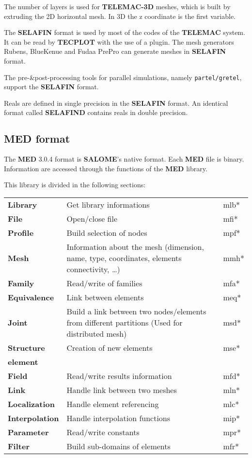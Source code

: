 \documentclass[a4paper,10pt]{article}
\newcommand{\tel}{\textbf{TELEMAC}\xspace}
\newcommand{\teldd}{\textbf{TELEMAC-3D}\xspace}
\newcommand{\slf}{\textbf{SELAFIN}\xspace}
\newcommand{\sal}{\textbf{SALOME}\xspace}
\newcommand{\med}{\textbf{MED}\xspace}
\newcommand{\tecplot}{\textbf{TECPLOT}\xspace}
\begin{document}
The number of layers is used for \teldd meshes, which is built by extruding the 2D horizontal mesh.
In 3D the z coordinate is the first variable.

The \slf format is used by most of the codes of the \tel system. It can be read by \tecplot with the use of a plugin.
The mesh generators Rubens, BlueKenue and Fudaa PrePro can generate meshes in \slf format.

The pre-\&post-processing tools for parallel simulations, namely \verb+partel/gretel+, support the \slf format.

Reals are defined in single precision in the \slf format. An identical format called \textbf{SELAFIND} contains reals in double precision.

\subsection{\med format\cite{med}}

The \med3.0.4 format is \sal's native format. Each \med file is binary. Information are accessed through the functions of the \med library.

This library is divided in the following sections:

\begin{tabular}{p{70pt}@{ : }p{200pt}p{50pt}}
  \textbf{Library} & Get library informations & mlb* \\
  \textbf{File} & Open/close file & mfi* \\
  \textbf{Profile} & Build selection of nodes & mpf*\\
  \textbf{Mesh} & Information about the mesh (dimension, name, type, coordinates, elements connectivity, \ldots) & mmh*\\
  \textbf{Family} & Read/write of families & mfa*\\
  \textbf{Equivalence} & Link between elements & meq*\\
  \textbf{Joint} & Build a link between two nodes/elements from different partitions (Used for distributed mesh)& msd*\\
  \textbf{Structure} & Creation of new elements & mse*\\
  \textbf{element} & & \\
  \textbf{Field} & Read/write results information & mfd*\\
  \textbf{Link} & Handle link between two meshes & mln*\\
  \textbf{Localization} & Handle element referencing & mlc*\\
  \textbf{Interpolation} & Handle interpolation functions & mip*\\
  \textbf{Parameter} & Read/write constants & mpr*\\
  \textbf{Filter} & Build sub-domains of elements & mfr*\\
\end{tabular}
\end{document}
